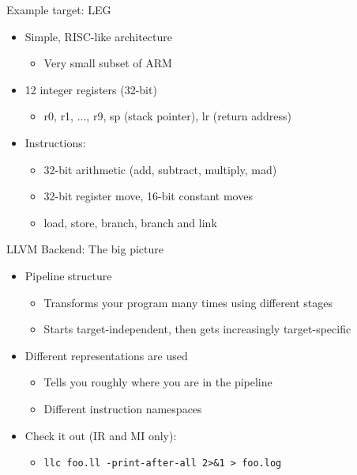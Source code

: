 
\begin{frame}{Example target: LEG}

\begin{itemize}
    \item Simple, RISC-like architecture
    \begin{itemize}
        \item Very small subset of ARM
    \end{itemize}
    \item 12 integer registers (32-bit)
    \begin{itemize}
        \item r0, r1, ..., r9, sp (stack pointer), lr (return address)
    \end{itemize}
    \item Instructions:
    \begin{itemize}
        \item 32-bit arithmetic (add, subtract, multiply, mad)
        \item 32-bit register move, 16-bit constant moves
        \item load, store, branch, branch and link
    \end{itemize}
\end{itemize}

\end{frame}


\begin{frame}{LLVM Backend: The big picture}

\begin{itemize}
    \item Pipeline structure
    \begin{itemize}
        \item Transforms your program many times using different stages
        \item Starts target-independent, then gets increasingly target-specific
    \end{itemize}
    \item Different representations are used
    \begin{itemize}
        \item Tells you roughly where you are in the pipeline
        \item Different instruction namespaces
    \end{itemize}
    \item Check it out (IR and MI only):
    \begin{itemize}
        \item \texttt{llc foo.ll -print-after-all 2>\&1 > foo.log}
    \end{itemize}
\end{itemize}


\end{frame}


